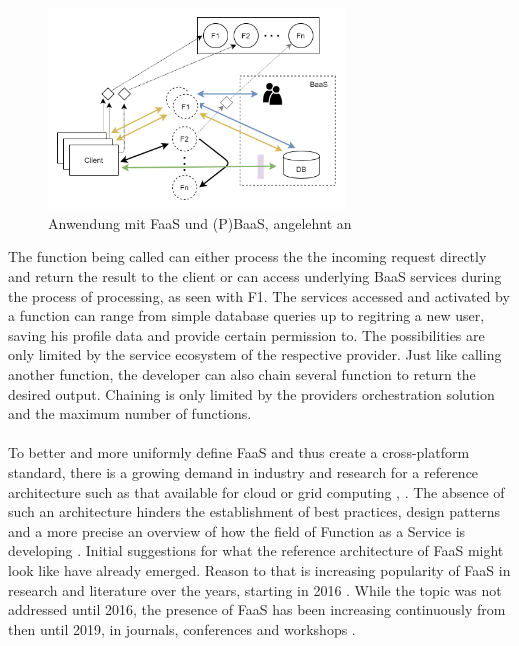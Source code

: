 \documentclass[11pt]{article}
\begin{document}
\begin{figure}[H]
\caption{Anwendung mit FaaS und (P)BaaS, angelehnt an \cite{shafiei2020serverless}}
\label{fig:FaaSBaaSExample}
\centering
\includegraphics[width=0.7\textwidth]{FaaS}
\end{figure}
The function being called can either process the the incoming request directly and return the result to the client or can access underlying BaaS services during the process of processing, as seen with F1. The services accessed and activated by a function can range from simple database queries up to regitring a new user, saving his profile data and provide certain permission to. The possibilities are only limited by the service ecosystem of the respective provider. Just like calling another function, the developer can also chain several function to return the desired output. Chaining is only limited by the providers orchestration solution and the maximum number of functions. \\\\
To better and more uniformly define FaaS and thus create a cross-platform standard, there is a growing demand in industry and research for a reference architecture such as that available for cloud or grid computing \cite{liu2011nist}, \cite{foster2003grid}. The absence of such an architecture hinders the establishment of best practices, design patterns and a more precise an overview of how the field of Function as a Service is developing \cite{leitner2019mixed}. Initial suggestions for what the reference architecture of FaaS might look like have already emerged. Reason to that is increasing popularity of FaaS in research and literature over the years, starting in 2016  \cite{van2019spec}. While the topic was not addressed until 2016, the presence of FaaS has been increasing continuously from then until 2019, in journals, conferences and workshops \cite{Yussupov2019_SystematicMappingStudyFaaS}.
\end{document}
